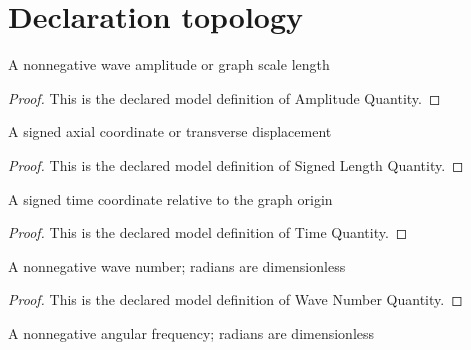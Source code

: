 \section{Declaration topology}
\begin{definition}
  \label{def:physics:phyx-mini-0300:phyxminiproblems-problemphyxmini0300-amplitudequantity}
  A nonnegative wave amplitude or graph scale length
\end{definition}
\begin{proof}
  This is the declared model definition of Amplitude Quantity.
\end{proof}
\begin{definition}
  \label{def:physics:phyx-mini-0300:phyxminiproblems-problemphyxmini0300-signedlengthquantity}
  A signed axial coordinate or transverse displacement
\end{definition}
\begin{proof}
  This is the declared model definition of Signed Length Quantity.
\end{proof}
\begin{definition}
  \label{def:physics:phyx-mini-0300:phyxminiproblems-problemphyxmini0300-timequantity}
  A signed time coordinate relative to the graph origin
\end{definition}
\begin{proof}
  This is the declared model definition of Time Quantity.
\end{proof}
\begin{definition}
  \label{def:physics:phyx-mini-0300:phyxminiproblems-problemphyxmini0300-wavenumberquantity}
  A nonnegative wave number; radians are dimensionless
\end{definition}
\begin{proof}
  This is the declared model definition of Wave Number Quantity.
\end{proof}
\begin{definition}
  \label{def:physics:phyx-mini-0300:phyxminiproblems-problemphyxmini0300-angularfrequencyquantity}
  A nonnegative angular frequency; radians are dimensionless
\end{definition}
